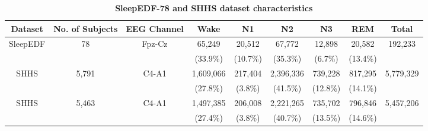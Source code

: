 
\begin{table*}
\centering
\caption{\textbf{SleepEDF-78 and SHHS dataset characteristics}}
\vspace{-10pt}
\label{table1}
\begin{tabular}{ccc|cccccc}
\hline\hline
Dataset & No. of Subjects & EEG Channel & Wake & N1 & N2 & N3 & REM & Total \\
\hline
\multirow{2}{*}{SleepEDF} & \multirow{2}{*}{78} & \multirow{2}{*}{Fpz-Cz} & 65,249 & 20,512 & 67,772 & 12,898 & 20,582 & \multirow{2}{*}{192,233} \\
                            &                     &                         & (33.9\%) & (10.7\%) & (35.3\%) & (6.7\%) & (13.4\%) &  \\




\multirow{2}{*}{SHHS}      & \multirow{2}{*}{5,791} & \multirow{2}{*}{C4-A1} & 1,609,066 & 217,404 & 2,396,336 & 739,228 & 817,295 & \multirow{2}{*}{5,779,329} \\
                            &                       &                        & (27.8\%) & (3.8\%) & (41.5\%) & (12.8\%) & (14.1\%) &  \\

\multirow{2}{*}{SHHS}      & \multirow{2}{*}{5,463} & \multirow{2}{*}{C4-A1} & 1,497,385 & 206,008 & 2,221,265 & 735,702 & 796,846 & \multirow{2}{*}{5,457,206} \\
                            &                       &                        & (27.4\%) & (3.8\%) & (40.7\%) & (13.5\%) & (14.6\%) &  \\
\hline\hline


\end{tabular}
\end{table*}
